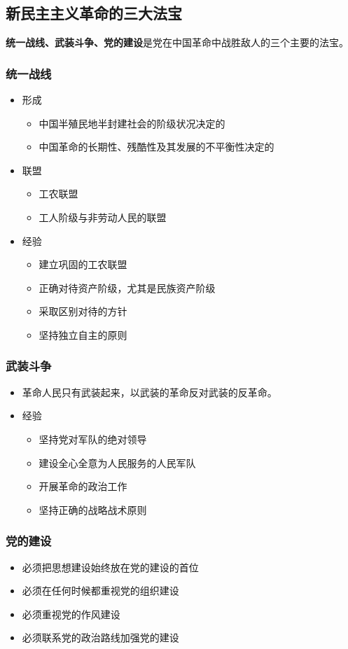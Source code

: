 \documentclass[12pt,openany]{ctexbook}
\begin{document}
\subsection{新民主主义革命的三大法宝}
\textbf{统一战线、武装斗争、党的建设}是党在中国革命中战胜敌人的三个主要的法宝。
\subsubsection{统一战线}
\begin{itemize}
  \item 形成
\begin{itemize}
  \item 中国半殖民地半封建社会的阶级状况决定的
  \item 中国革命的长期性、残酷性及其发展的不平衡性决定的
\end{itemize}
  \item 联盟
\begin{itemize}
  \item 工农联盟
  \item 工人阶级与非劳动人民的联盟
\end{itemize}
  \item 经验
\begin{itemize}
  \item 建立巩固的工农联盟
  \item 正确对待资产阶级，尤其是民族资产阶级
  \item 采取区别对待的方针
  \item 坚持独立自主的原则
\end{itemize}
\end{itemize}
\subsubsection{武装斗争}
\begin{itemize}
  \item 革命人民只有武装起来，以武装的革命反对武装的反革命。
  \item 经验
\begin{itemize}
  \item 坚持党对军队的绝对领导
  \item 建设全心全意为人民服务的人民军队
  \item 开展革命的政治工作
  \item 坚持正确的战略战术原则
\end{itemize}
\end{itemize}
\subsubsection{党的建设}
\begin{itemize}
  \item 必须把思想建设始终放在党的建设的首位
  \item 必须在任何时候都重视党的组织建设
  \item 必须重视党的作风建设
  \item 必须联系党的政治路线加强党的建设
\end{itemize}
\end{document}
